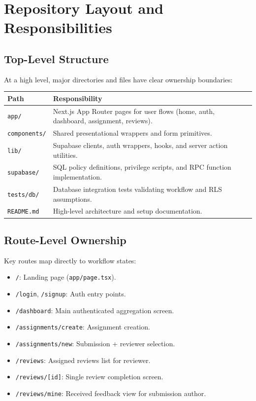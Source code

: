 \documentclass[11pt]{article}
\begin{document}
\section{Repository Layout and Responsibilities}
\subsection{Top-Level Structure}
At a high level, major directories and files have clear ownership boundaries:

\begin{longtable}{>{\ttfamily}p{} p{}}
\toprule
Path & Responsibility \\
\midrule
\textnormal{\texttt{app/}} & Next.js App Router pages for user flows (home, auth, dashboard, assignment, reviews). \\
\textnormal{\texttt{components/}} & Shared presentational wrappers and form primitives. \\
\textnormal{\texttt{lib/}} & Supabase clients, auth wrappers, hooks, and server action utilities. \\
\textnormal{\texttt{supabase/}} & SQL policy definitions, privilege scripts, and RPC function implementation. \\
\textnormal{\texttt{tests/db/}} & Database integration tests validating workflow and RLS assumptions. \\
\textnormal{\texttt{README.md}} & High-level architecture and setup documentation. \\
\bottomrule
\end{longtable}

\subsection{Route-Level Ownership}
Key routes map directly to workflow states:
\begin{itemize}[leftmargin=*]
  \item \texttt{/}: Landing page (\texttt{app/page.tsx}).
  \item \texttt{/login}, \texttt{/signup}: Auth entry points.
  \item \texttt{/dashboard}: Main authenticated aggregation screen.
  \item \texttt{/assignments/create}: Assignment creation.
  \item \texttt{/assignments/new}: Submission + reviewer selection.
  \item \texttt{/reviews}: Assigned reviews list for reviewer.
  \item \texttt{/reviews/[id]}: Single review completion screen.
  \item \texttt{/reviews/mine}: Received feedback view for submission author.
\end{itemize}
\end{document}
